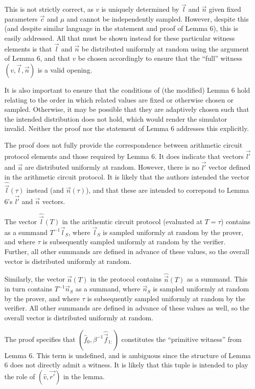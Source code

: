\documentclass{article}
\begin{document}
This is not strictly correct, as $v$ is uniquely determined by $\vec{l}$ and $\vec{n}$ given fixed parameters $\vec{c}$ and $\mu$ and cannot be independently sampled.
However, despite this (and despite similar language in the statement and proof of Lemma 6), this is easily addressed.
All that must be shown instead for these particular witness elements is that $\vec{l}$ and $\vec{n}$ be distributed uniformly at random using the argument of Lemma 6, and that $v$ be chosen accordingly to ensure that the ``full'' witness $(v, \vec{l}, \vec{n})$ is a valid opening.

It is also important to ensure that the conditions of (the modified) Lemma 6 hold relating to the order in which related values are fixed or otherwise chosen or sampled.
Otherwise, it may be possible that they are adaptively chosen such that the intended distribution does not hold, which would render the simulator invalid.
Neither the proof nor the statement of Lemma 6 addresses this explicitly.

The proof does not fully provide the correspondence between arithmetic circuit protocol elements and those required by Lemma 6.
It does indicate that vectors $\vec{l'}$ and $\vec{n}$ are distributed uniformly at random.
However, there is no $\vec{l'}$ vector defined in the arithmetic circuit protocol.
It is likely that the authors intended the vector $\hat{\vec{l}}(\tau)$ instead (and $\vec{n}(\tau)$), and that these are intended to correpond to Lemma 6's $\vec{l'}$ and $\vec{n}$ vectors.

The vector $\hat{\vec{l}}(T)$ in the arithemtic circuit protocol (evaluated at $T = \tau$) contains as a summand $T^{-1} \vec{l}_S$, where $\vec{l}_S$ is sampled uniformly at random by the prover, and where $\tau$ is subsequently sampled uniformly at random by the verifier.
Further, all other summands are defined in advance of these values, so the overall vector is distributed uniformly at random.

Similarly, the vector $\vec{n}(T)$ in the protocol contains $\hat{\vec{n}}(T)$ as a summand.
This in turn contains $T^{-1} \vec{n}_S$ as a summand, where $\vec{n}_S$ is sampled uniformly at random by the prover, and where $\tau$ is subsequently sampled uniformly at random by the verifier.
All other summands are defined in advance of these values as well, so the overall vector is distributed uniformly at random.

The proof specifies that $(\hat{f}_0, \beta^{-1} \hat{\vec{f}}_{1:})$ constitutes the ``primitive witness'' from Lemma 6.
This term is undefined, and is ambiguous since the structure of Lemma 6 does not directly admit a witness.
It is likely that this tuple is intended to play the role of $(\hat{v}, \vec{r'})$ in the lemma.
\end{document}
